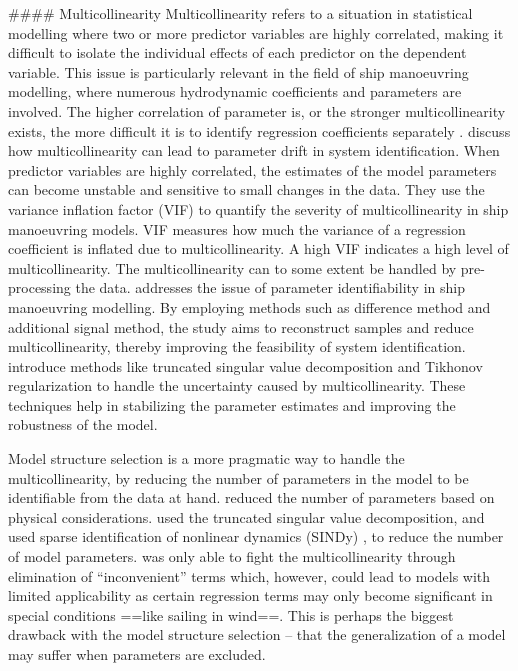 #### Multicollinearity
Multicollinearity refers to a situation in statistical modelling where two or more predictor variables are highly correlated, making it difficult to isolate the individual effects of each predictor on the dependent variable. This issue is particularly relevant in the field of ship manoeuvring modelling, where numerous hydrodynamic coefficients and parameters are involved.
The higher correlation of parameter is, or the stronger multicollinearity exists, the more difficult it is to identify regression coefficients separately \cite{yoonIdentificationHydrodynamicCoefficients2003}.
\cite{wangQuantifyingMulticollinearityShip2018} discuss how multicollinearity can lead to parameter drift in system identification. When predictor variables are highly correlated, the estimates of the model parameters can become unstable and sensitive to small changes in the data. They use the variance inflation factor (VIF) to quantify the severity of multicollinearity in ship manoeuvring models. VIF measures how much the variance of a regression coefficient is inflated due to multicollinearity. A high VIF indicates a high level of multicollinearity.
The multicollinearity can to some extent be handled by pre-processing the data.
\cite{luoParameterIdentificationShip2016} addresses the issue of parameter identifiability in ship manoeuvring modelling. By employing methods such as difference method and additional signal method, the study aims to reconstruct samples and reduce multicollinearity, thereby improving the feasibility of system identification.
\cite{xuUncertaintyAnalysisHydrodynamic2019} introduce methods like truncated singular value decomposition and Tikhonov regularization to handle the uncertainty caused by multicollinearity. These techniques help in stabilizing the parameter estimates and improving the robustness of the model.

Model structure selection is a more pragmatic way to handle the multicollinearity, by reducing the number of parameters in the model to be identifiable from the data at hand.  \cite{luoParameterIdentificationShip2016} reduced the number of parameters based on physical considerations. \cite{costaRobustParameterEstimation2021} used the truncated singular value decomposition, and \cite{liuPhysicsinformedIdentificationMarine2024} used sparse identification of nonlinear dynamics (SINDy) \cite{bruntonDiscoveringGoverningEquations2016}, to reduce the number of model parameters. 
\cite{abkowitzMEASUREMENTHYDRODYNAMICCHARACTERISTICS1980} was only able to fight the multicollinearity through elimination of “inconvenient” terms which, however, could lead to models with limited applicability as certain regression terms may only become significant in special conditions ==like sailing in wind==. This is perhaps the biggest drawback with the model structure selection – that the generalization of a model may suffer when parameters are excluded.

